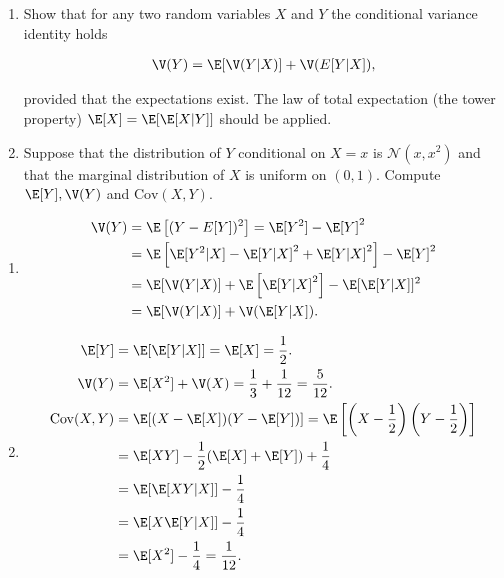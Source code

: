 
\begin{exercise}

\phantom{}

\begin{enumerate}[label = (\alph*)]
  \item Show that for any two random variables $X$ and $Y$ the conditional variance
  identity holds

  \begin{align*}
    \V(Y) = \E[\V(Y|X)] + \V(E[Y|X]),
  \end{align*}

  provided that the expectations exist. The law of total expectation (the tower property)
  $\E[X] = \E[\E[X|Y]]$ should be applied.

  \item Suppose that the distribution of $Y$ conditional on $X = x$ is $\mathcal{N}(x,x^2)$
  and that the marginal distribution of $X$ is uniform on $(0,1)$. Compute
  $\E[Y], \V(Y)$ and $\mathrm{Cov}(X,Y)$.
\end{enumerate}

\end{exercise}


\begin{solution}

\phantom{}

\begin{enumerate}[label = (\alph*)]
  \item

  \begin{align*}
    \V(Y) &= \E\left[(Y - E[Y])^2\right] = \E[Y^2] - \E[Y]^2 \\
    &= \E\left[\E[Y^2|X] - \E[Y|X]^2 + \E[Y|X]^2\right] - \E[Y]^2 \\
    &= \E[\V(Y|X)] + \E\left[\E[Y|X]^2\right] - \E[\E[Y|X]]^2 \\
    &= \E[\V(Y|X)] + \V(\E[Y|X]).
  \end{align*}

  \item

  \begin{align*}
    \E[Y] &= \E[\E[Y|X]] = \E[X] = \frac{1}{2}. \\
    \V(Y) &= \E[X^2] + \V(X) = \frac{1}{3} + \frac{1}{12} = \frac{5}{12}. \\
    \mathrm{Cov}(X,Y) &= \E[(X - \E[X])(Y - \E[Y])]
    = \E\left[\left(X - \frac{1}{2}\right)\left(Y - \frac{1}{2}\right)\right] \\
    &= \E[XY] - \frac{1}{2}(\E[X] + \E[Y]) + \frac{1}{4} \\
    &= \E[\E[XY|X]] - \frac{1}{4} \\
    &= \E[X\E[Y|X]] - \frac{1}{4} \\
    &= \E[X^2] - \frac{1}{4} = \frac{1}{12}.
  \end{align*}
\end{enumerate}

\end{solution}

